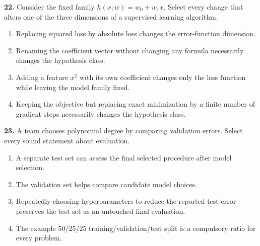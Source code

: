 \documentclass[11pt,a4paper]{article}
\begin{document}
\par\noindent\begin{minipage}{\linewidth}
\textbf{22.} Consider the fixed family \(h(x;w)=w_0+w_1x\). Select every change that alters one of the three dimensions of a supervised learning algorithm.
\begin{enumerate}[label=(\Alph*),leftmargin=8mm,itemsep=2pt,topsep=2pt]
\item Replacing squared loss by absolute loss changes the error-function dimension.
\item Renaming the coefficient vector without changing any formula necessarily changes the hypothesis class.
\item Adding a feature \(x^2\) with its own coefficient changes only the loss function while leaving the model family fixed.
\item Keeping the objective but replacing exact minimization by a finite number of gradient steps necessarily changes the hypothesis class.
\end{enumerate}

\end{minipage}\par\vspace{3mm}
\par\noindent\begin{minipage}{\linewidth}
\textbf{23.} A team chooses polynomial degree by comparing validation errors. Select every sound statement about evaluation.
\begin{enumerate}[label=(\Alph*),leftmargin=8mm,itemsep=2pt,topsep=2pt]
\item A separate test set can assess the final selected procedure after model selection.
\item The validation set helps compare candidate model choices.
\item Repeatedly choosing hyperparameters to reduce the reported test error preserves the test set as an untouched final evaluation.
\item The example 50/25/25 training/validation/test split is a compulsory ratio for every problem.
\end{enumerate}

\end{minipage}\par\vspace{3mm}
\end{document}
